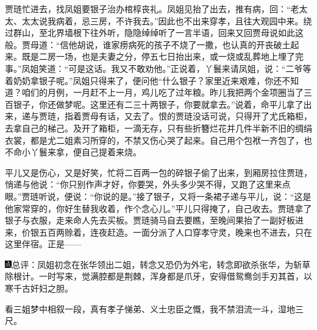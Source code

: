 贾琏忙进去，找凤姐要银子治办棺椁丧礼。凤姐见抬了出去，推有病，回：``老太太、太太说我病着，忌三房，不许我去。''因此也不出来穿孝，且往大观园中来。绕过群山，至北界墙根下往外听，隐隐绰绰听了一言半语，回来又回贾母说如此这般。贾母道：``信他胡说，谁家痨病死的孩子不烧了一撒，也认真的开丧破土起来。既是二房一场，也是夫妻之分，停五七日抬出来，或一烧或乱葬地上埋了完事。''凤姐笑道：``可是这话。我又不敢劝他。''正说着，丫鬟来请凤姐，说：``二爷等着奶奶拿银子呢。''凤姐只得来了，便问他``什么银子？家里近来艰难，你还不知道？咱们的月例，一月赶不上一月，鸡儿吃了过年粮。昨儿我把两个金项圈当了三百银子，你还做梦呢。这里还有二三十两银子，你要就拿去。''说着，命平儿拿了出来，递与贾琏，指着贾母有话，又去了。恨的贾琏没话可说，只得开了尤氏箱柜，去拿自己的梯己。及开了箱柜，一滴无存，只有些折簪烂花并几件半新不旧的绸绢衣裳，都是尤二姐素习所穿的，不禁又伤心哭了起来。自己用个包袱一齐包了，也不命小丫鬟来拿，便自己提着来烧。

平儿又是伤心，又是好笑，忙将二百两一包的碎银子偷了出来，到厢房拉住贾琏，悄递与他说：``你只别作声才好，你要哭，外头多少哭不得，又跑了这里来点眼。''贾琏听说，便说：``你说的是。''接了银子，又将一条裙子递与平儿，说：``这是他家常穿的，你好生替我收着，作个念心儿。''平儿只得掩了，自己收去。贾琏拿了银子与衣服，走来命人先去买板。贾琏骑马自去要瞧，至晚间果抬了一副好板进来，价银五百两赊着，连夜赶造。一面分派了人口穿孝守灵，晚来也不进去，只在这里伴宿。正是------

{\includegraphics[width=3mm]{../Images/00005}\kaishu 总评：凤姐初念在张华领出二姐，转念又恐仍为外宅，转念即欲杀张华，为斩草除根计。一时写来，觉满腔都是荆棘，浑身都是爪牙，安得借鸳鸯剑手刃其首，以寒千古奸妇之胆。}

{\kaishu 看三姐梦中相叙一段，真有孝子悌弟、义士忠臣之慨，我不禁泪流一斗，湿地三尺。}
